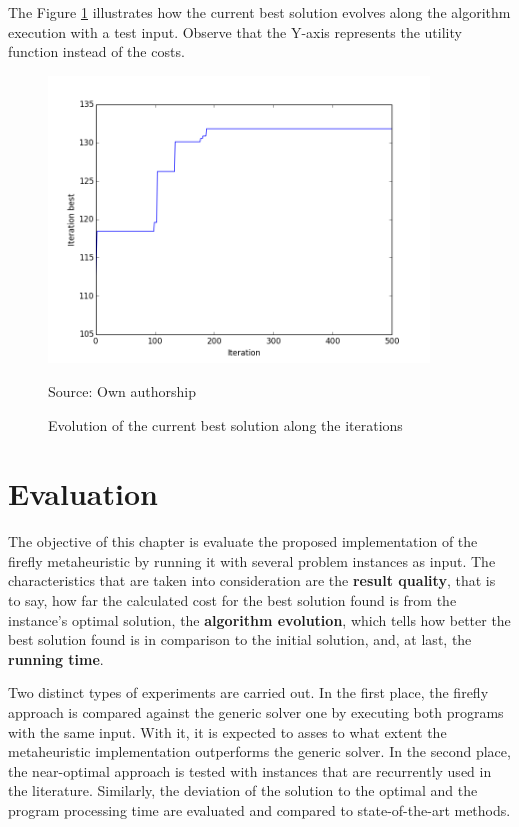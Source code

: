 \documentclass[tuberlin,cic,tc,openright,english,noabntcite,oneside]{iiufrgs}
\begin{document}
The Figure \ref{fig:best-solution-evolution} illustrates how the current best solution evolves along the algorithm  execution with a test input. Observe that the Y-axis represents the utility function instead of the costs.
\begin{figure}[H]
	\centering
    \caption{Evolution of the current best solution along the iterations}
    \includegraphics[width=0.9\textwidth]{fig_best_sol_evolution}\par
	Source: Own authorship
    \label{fig:best-solution-evolution}
\end{figure}

\chapter{Evaluation}
The objective of this chapter is evaluate the proposed implementation of the firefly metaheuristic by running it with several problem instances as input. The characteristics that are taken into consideration are the \textbf{result quality}, that is to say, how far the calculated cost for the best solution found is from the instance's optimal solution, the \textbf{algorithm evolution}, which tells how better the best solution found is in comparison to the initial solution, and, at last, the \textbf{running time}.

Two distinct types of experiments are carried out. In the first place, the firefly approach is compared against the generic solver one by executing both programs with the same input. With it, it is expected to asses to what extent the metaheuristic implementation outperforms the generic solver. In the second place, the near-optimal approach is tested with instances that are recurrently used in the literature. Similarly, the deviation of the solution to the optimal and the program processing time are evaluated and compared to state-of-the-art methods.
\end{document}
